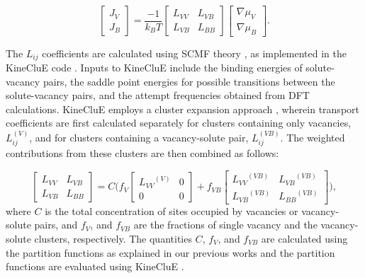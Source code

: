 \documentclass[preprint,12pt]{elsarticle}
\begin{document}
\begin{equation}
\label{matrix_form_onsager}
    \begin{bmatrix}
        J_V \\
        J_B 
    \end{bmatrix}=\frac{-1}{k_B T}
    \begin{bmatrix}
    L_{VV} & L_{VB} \\
    L_{VB} & L_{BB}
    \end{bmatrix}
        \begin{bmatrix}
        \nabla\mu_V \\
        \nabla\mu_B
    \end{bmatrix}.
\end{equation}

\noindent The $L_{ij}$ coefficients are calculated using SCMF theory \citep{nastar_self-consistent_2000, nastar_mean_2005}, as implemented in the KineCluE code \citep{schuler_kineclue_2020}. Inputs to KineCluE include the binding energies of solute-vacancy pairs, the saddle point energies for possible transitions between the solute-vacancy pairs, and the attempt frequencies obtained from DFT calculations. KineCluE employs a cluster expansion approach \citep{schuler_kineclue_2020}, wherein transport coefficients are first calculated separately for clusters containing only vacancies, $L_{ij}^{(V)}$, and for clusters containing a vacancy-solute pair, $L_{ij}^{(VB)}$. The weighted contributions from these clusters are then combined as follows:

\begin{equation}
\label{eq_cluster_exp}
\begin{bmatrix}
L_{VV} & L_{VB} \\
L_{VB} & L_{BB}
\end{bmatrix}
=
C \Biggl(
f_V 
\begin{bmatrix}
{L_{VV}}^{(V)} & 0 \\
0 & 0 
\end{bmatrix}
+ f_{VB}
\begin{bmatrix}
{L_{VV}}^{(VB)} & {L_{VB}}^{(VB)} \\
{L_{VB}}^{(VB)} & {L_{BB}}^{(VB)}
\end{bmatrix}
\Biggr),
\end{equation}
where $C$ is the total concentration of sites occupied by vacancies or vacancy-solute pairs, and $f_V$, and $f_{VB}$ are the fractions of single vacancy and the vacancy-solute clusters, respectively. The quantities $C$, $f_V$, and $f_{VB}$ are calculated using the partition functions as explained in our previous works \cite{shousha2024first, shousha_vacancy-mediated_2024} and the partition functions are evaluated using KineCluE \citep{schuler_kineclue_2020}.
\end{document}
